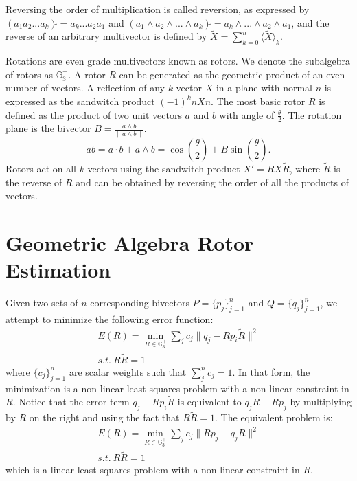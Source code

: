 \documentclass{birkjour}
\numberwithin{equation}{section}
\begin{document}
Reversing the order of multiplication is called reversion, as expressed by $(a_1 a_2 ... a_k)\tilde{} = a_k ... a_2 a_1$ and $(a_1 \wedge a_2 \wedge ... \wedge a_k)\tilde{} = a_k \wedge ... \wedge a_2 \wedge a_1$, and the reverse of an arbitrary multivector is defined by $\tilde{X} = \sum_{k=0}^n { \langle \tilde{X} \rangle_k }$.

Rotations are even grade multivectors known as rotors. We denote the subalgebra of rotors as $\mathbb{G}^{+}_3$. A rotor $R$ can be generated as the geometric product of an even number of vectors. A reflection of any $k$-vector $X$ in a plane with normal $n$ is expressed as the sandwitch product $(-1)^k n X n$. The most basic rotor $R$ is defined as the product of two unit vectors $a$ and $b$ with angle of $\frac{\theta}{2}$. The rotation plane is the bivector $B = \frac{a \wedge b}{\| a \wedge b \|}$.
\begin{equation*}
a b = a \cdot b + a \wedge b = \cos\left( \frac{\theta}{2} \right) + B \sin\left( \frac{\theta}{2} \right).
\end{equation*}
Rotors act on all $k$-vectors using the sandwitch product $X' = R X \tilde R$, where $\tilde R$ is the reverse of $R$ and can be obtained by reversing the order of all the products of vectors.

\section{Geometric Algebra Rotor Estimation}

Given two sets of $n$ corresponding bivectors $P = \{p_j\}_{j=1}^n$ and $Q = \{q_j\}_{j=1}^n$, we attempt to minimize the following error function:
\begin{eqnarray*}
E(R) = \min_{R \in \mathbb{G}^{+}_3 } \sum_j { c_{j} \|q_j - R p_i \tilde R\|^2 }\\
s.t. \ R \tilde R = 1
\end{eqnarray*}
where $\{c_{j}\}_{j=1}^n$ are scalar weights such that $\sum_j^n{c_j} = 1$. In that form, the minimization is a non-linear least squares problem with a non-linear constraint in $R$. Notice that the error term $q_j - R p_i \tilde R$ is equivalent to $q_j R - R p_j$ by multiplying by $R$ on the right and using the fact that $R \tilde R = 1$. The equivalent problem is:
\begin{eqnarray*}
E(R) = \min_{R \in \mathbb{G}^{+}_3 } \sum_j { c_{j} \|R p_j - q_j R\|^2 }\\
s.t. \ R \tilde R = 1
\end{eqnarray*}
which is a linear least squares problem with a non-linear constraint in $R$.
\end{document}
